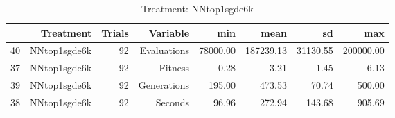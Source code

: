 \begin{table}[ht]
\centering
\begin{tabular}{rrrrrrrr}
  \hline
 & Treatment & Trials & Variable & min & mean & sd & max \\ 
  \hline
40 & NNtop1sgde6k &  92 & Evaluations & 78000.00 & 187239.13 & 31130.55 & 200000.00 \\ 
  37 & NNtop1sgde6k &  92 & Fitness & 0.28 & 3.21 & 1.45 & 6.13 \\ 
  39 & NNtop1sgde6k &  92 & Generations & 195.00 & 473.53 & 70.74 & 500.00 \\ 
  38 & NNtop1sgde6k &  92 & Seconds & 96.96 & 272.94 & 143.68 & 905.69 \\ 
   \hline
\end{tabular}
\caption{Treatment: NNtop1sgde6k} 
\end{table}
